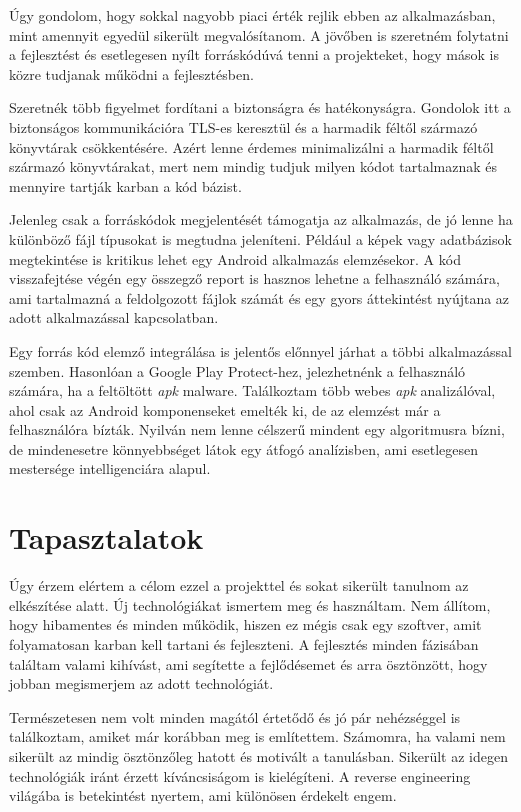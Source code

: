 \documentclass{thesis-ekf}
\theoremstyle{definition}
\theoremstyle{remark}
\begin{document}
Úgy gondolom, hogy sokkal nagyobb piaci érték rejlik ebben az alkalmazásban, mint amennyit egyedül sikerült megvalósítanom.
A jövőben is szeretném folytatni a fejlesztést és esetlegesen nyílt forráskódúvá tenni a projekteket, hogy mások is közre tudjanak működni a fejlesztésben.

Szeretnék több figyelmet fordítani a biztonságra és hatékonyságra. 
Gondolok itt a biztonságos kommunikációra TLS-es keresztül és a harmadik féltől származó könyvtárak csökkentésére.
Azért lenne érdemes minimalizálni a harmadik féltől származó könyvtárakat, mert nem mindig tudjuk milyen kódot tartalmaznak és mennyire tartják karban a kód bázist.

Jelenleg csak a forráskódok megjelentését támogatja az alkalmazás, de jó lenne ha különböző fájl típusokat is megtudna jeleníteni.
Például a képek vagy adatbázisok megtekintése is kritikus lehet egy Android alkalmazás elemzésekor.
A kód visszafejtése végén egy összegző report is hasznos lehetne a felhasználó számára, ami tartalmazná a feldolgozott fájlok számát és egy gyors áttekintést nyújtana az adott alkalmazással kapcsolatban.

Egy forrás kód elemző integrálása is jelentős előnnyel járhat a többi alkalmazással szemben. Hasonlóan a Google Play Protect-hez, jelezhetnénk a felhasználó számára, ha a feltöltött \emph{apk} malware.
Találkoztam több webes \emph{apk} analizálóval, ahol csak az Android komponenseket emelték ki, de az elemzést már a felhasználóra bízták.
Nyilván nem lenne célszerű mindent egy algoritmusra bízni, de mindenesetre könnyebbséget látok egy átfogó analízisben, ami esetlegesen mestersége intelligenciára alapul.

\chapter{Tapasztalatok}\label{tapasztalatok}

Úgy érzem elértem a célom ezzel a projekttel és sokat sikerült tanulnom az elkészítése alatt.
Új technológiákat ismertem meg és használtam. Nem állítom, hogy hibamentes és minden működik, hiszen ez mégis csak egy szoftver, amit folyamatosan karban kell tartani és fejleszteni.
A fejlesztés minden fázisában találtam valami kihívást, ami segítette a fejlődésemet és arra ösztönzött, hogy jobban megismerjem az adott technológiát.

Természetesen nem volt minden magától értetődő és jó pár nehézséggel is találkoztam, amiket már korábban meg is említettem.
Számomra, ha valami nem sikerült az mindig ösztönzőleg hatott és motivált a tanulásban. Sikerült az idegen technológiák iránt érzett kíváncsiságom is kielégíteni.
A reverse engineering világába is betekintést nyertem, ami különösen érdekelt engem. 
\end{document}
